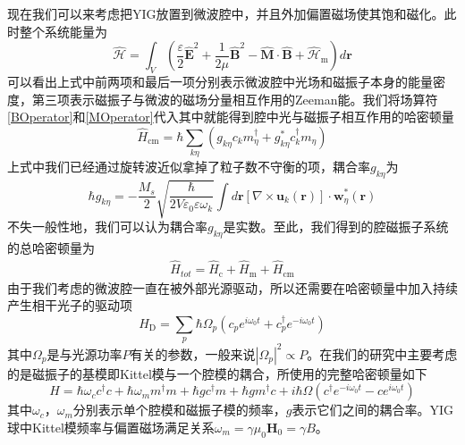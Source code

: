 现在我们可以来考虑把YIG放置到微波腔中，并且外加偏置磁场使其饱和磁化。此时整个系统能量为\cite{reviewCavityMagnonics}
\begin{equation}
\hat{\mathcal{H}}=\int_V \left(\frac{\varepsilon}{2} \hat{\mathbf{E}}^{2}+\frac{1}{2 \mu} \hat{\mathbf{B}}^{2}-\hat{\mathbf{M}} \cdot \hat{\mathbf{B}}+\hat{\mathcal{H}}_{\mathrm{m}}\right) d \mathbf{r}
\end{equation}
可以看出上式中前两项和最后一项分别表示微波腔中光场和磁振子本身的能量密度，第三项表示磁振子与微波的磁场分量相互作用的Zeeman能。我们将场算符\eqref{BOperator}和\eqref{MOperator}代入其中就能得到腔中光与磁振子相互作用的哈密顿量\ChangeNotation\cite{reviewCavityMagnonics}
\begin{equation}
\hat{H}_{\mathrm{cm}}=\hbar \sum_{k \eta}\left(g_{k \eta} {c}_{k} {m}_{\eta}^{\dagger}+g_{k \eta}^{*} {c}_{k}^{\dagger} {m}_{\eta}\right)
\end{equation}
上式中我们已经通过旋转波近似拿掉了粒子数不守衡的项\ChangeNotation，耦合率$g_{k \eta}$为
\begin{equation}
\hbar g_{k \eta}=-\frac{M_{s}}{2} \sqrt{\frac{\hbar}{2 V \varepsilon_{0} \varepsilon \omega_{k}}} \int d \mathbf{r}\left[\nabla \times \mathbf{u}_{k}(\mathbf{r})\right] \cdot \mathbf{w}_{\eta}^{*}(\mathbf{r})
\end{equation}
不失一般性地，我们可以认为耦合率$g_{k \eta}$是实数。至此，我们得到的腔磁振子系统的总哈密顿量为
\begin{equation}
\begin{aligned}
\hat{H}_{tot}=\hat{H}_{\mathrm{c}}+\hat{H}_{\mathrm{m}}+\hat{H}_{\mathrm{cm}}
\end{aligned}
\end{equation}
由于我们考虑的微波腔一直在被外部光源驱动，所以还需要在哈密顿量中加入持续产生相干光子的驱动项
\begin{equation}
\hat{H}_{\mathrm{D}}=\sum_{p} \hbar \Omega_{p}\left({c}_{p} e^{i \omega_{\mathrm{0}} t}+{c}_{p}^{\dagger} e^{-i \omega_{\mathrm{0}} t}\right)
\end{equation}
其中$\Omega_{p}$是与光源功率$P$有关的参数\ChangeNotation，一般来说$|\Omega_{p}|^2 \propto P$。在我们的研究中主要考虑的是磁振子的基模即Kittel模与一个腔模的耦合，所使用的完整哈密顿量如下
\begin{equation}
H = \hbar\omega_{c}c^{\dag}c+\hbar\omega_{m}m^{\dag}m+\hbar gc^{\dag}m+\hbar gm^{\dag}c+i\hbar\Omega(c^{\dag}e^{-i\omega_{0}t}-ce^{i\omega_{0}t})
\label{Hamiltonian}
\end{equation}
其中$\omega_{c}$，$\omega_{m}$分别表示单个腔模和磁振子模的频率，$g$表示它们之间的耦合率。YIG球中Kittel模频率与偏置磁场满足关系$\omega_{m}=\gamma\mu_{0} \mathbf{H}_{0}=\gamma B$。

